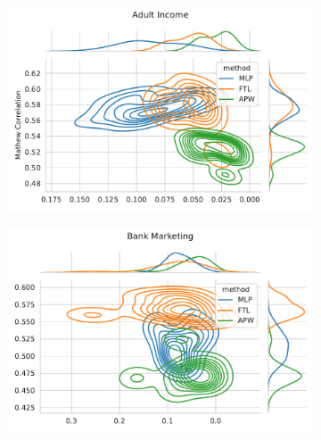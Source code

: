 \begin{figure}
\centering
\caption{Metric distribution optimizing MCC and Equalized Odds in comparison with Fair Transition Loss across multiple resample runs. Corresponding values available at Table~\ref{tab:complete_mcc_odds}.}
\label{fig:complete_mcc_odds}
\begin{subfigure}{.45\linewidth}
    \includegraphics[width=1\linewidth]{images/pareto_mcc_odds_adult.pdf}
\end{subfigure}
\begin{subfigure}{.45\linewidth}
    \includegraphics[width=1\linewidth]{images/pareto_mcc_odds_bank.pdf}
\end{subfigure}


\end{figure}
